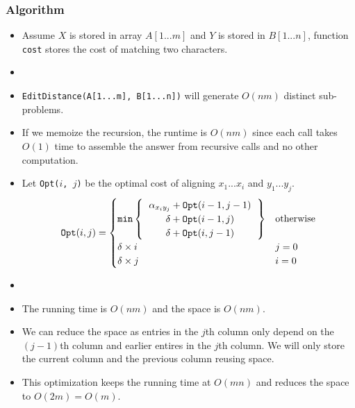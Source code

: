 \documentclass[12pt]{article}
\begin{document}
\subsubsection{Algorithm}
\begin{itemize}
    \item Assume $X$ is stored in array $A[1...m]$ and $Y$ is stored in $B[1...n]$, function \texttt{cost} stores the cost of matching two characters.
    \item[] 
    \item \texttt{EditDistance(A[1...m], B[1...n])} will generate $O(nm)$ distinct sub-problems.
    \item If we memoize the recursion, the runtime is $O(nm)$ since each call takes $O(1)$ time to assemble the answer from recursive calls and no other computation.
    \item Let \texttt{Opt($i$, $j$)} be the optimal cost of aligning $x_1...x_i$ and $y_1...y_j$.
    \begin{equation}
        \texttt{Opt}(i, j) = \begin{cases}
            \texttt{min} \left\{
                \begin{tabular}{c}
                    $\alpha_{x_iy_j} + \texttt{Opt}(i - 1, j - 1)$ \\
                    $\delta + \texttt{Opt}(i - 1, j)$ \\
                    $\delta + \texttt{Opt}(i, j - 1)$ \\
                \end{tabular}
            \right\} & \text{otherwise} \\
            \delta \times i & j = 0 \\
            \delta \times j & i = 0 \\
        \end{cases}
    \end{equation}
    \item[] 
    \item The running time is $O(nm)$ and the space is $O(nm)$.
    \item We can reduce the space as entries in the $j$th column only depend on the $(j - 1)$th column and earlier entires in the $j$th column. We will only store the current column and the previous column reusing space.
    \item This optimization keeps the running time at $O(mn)$ and reduces the space to $O(2m) = O(m)$.
\end{itemize}
\end{document}
